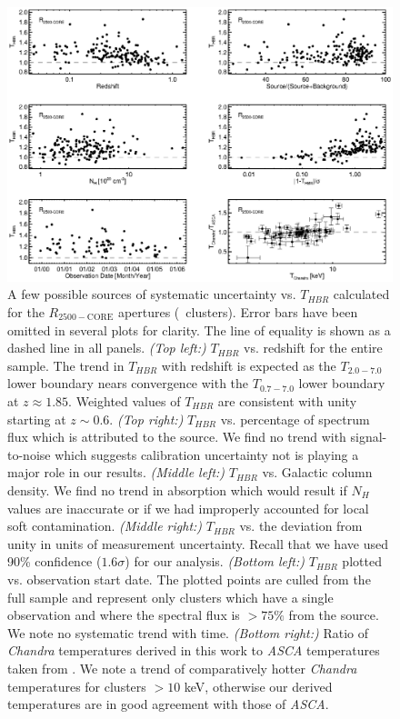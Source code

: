 \begin{figure}
\begin{center}
\includegraphics*[width=\textwidth, trim=0mm 0mm 0mm 0mm, clip]{eband_f4.eps}
\caption[Plot of several possible systematics for
  $R_{2500-\mathrm{CORE}}$ apertures.]{A few possible sources of
  systematic uncertainty vs. $T_{HBR}$ calculated for the
  $R_{2500-\mathrm{CORE}}$ apertures (\ebandnuma\ clusters). Error
  bars have been omitted in several plots for clarity. The line of
  equality is shown as a dashed line in all panels. {\it{(Top left:)}}
  $T_{HBR}$ vs. redshift for the entire sample. The trend in $T_{HBR}$
  with redshift is expected as the $T_{2.0-7.0}$ lower boundary nears
  convergence with the $T_{0.7-7.0}$ lower boundary at $z \approx
  1.85$. Weighted values of $T_{HBR}$ are consistent with unity
  starting at $z \sim 0.6$.  {\it{(Top right:)}} $T_{HBR}$
  vs. percentage of spectrum flux which is attributed to the
  source. We find no trend with signal-to-noise which suggests
  calibration uncertainty not is playing a major role in our results.
  {\it{(Middle left:)}} $T_{HBR}$ vs. Galactic column density. We find
  no trend in absorption which would result if $N_{H}$ values are
  inaccurate or if we had improperly accounted for local soft
  contamination.  {\it{(Middle right:)}} $T_{HBR}$ vs. the deviation
  from unity in units of measurement uncertainty. Recall that we have
  used 90\% confidence ($1.6\sigma$) for our analysis.  {\it{(Bottom
      left:)}} $T_{HBR}$ plotted vs. observation start date. The
  plotted points are culled from the full sample and represent only
  clusters which have a single observation and where the spectral flux
  is $> 75\%$ from the source. We note no systematic trend with time.
  {\it{(Bottom right:)}} Ratio of {\it Chandra} temperatures derived
  in this work to {\it ASCA} temperatures taken from
  \citet{hornerthesis}. We note a trend of comparatively hotter {\it
    Chandra} temperatures for clusters $> 10$ keV, otherwise our
  derived temperatures are in good agreement with those of {\it ASCA}.
}
\label{fig:sysr25}
\end{center}
\end{figure}

